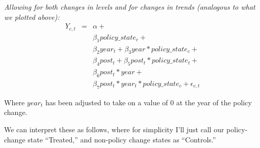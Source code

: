 \documentclass[12pt]{article}
\begin{document}
\emph{Allowing for both changes in levels and for changes in trends (analogous to what we plotted above):}
\begin{eqnarray}
 Y_{c,t} &=& \alpha + \label{diff_in_diff_wtime}\\
 && \beta_1 policy\_state_{c} + \nonumber\\
 && \beta_2 year_{t} + \beta_3 year * policy\_state_{c} + \nonumber\\
 && \beta_4 post_{t} + \beta_5 post_{t} * policy\_state_{t} + \nonumber \\
 && \beta_6 post_{t} * year + \nonumber\\
 && \beta_7 post_{t} * year_{t} * policy\_state_{c} + \epsilon_{c,t} \nonumber
\end{eqnarray}

Where $year_{t}$ has been adjusted to take on a value of 0 at the year of the policy change.


We can interpret these as follows, where for simplicity I'll just call our policy-change state ``Treated,'' and non-policy change states as ``Controls.''
\end{document}
